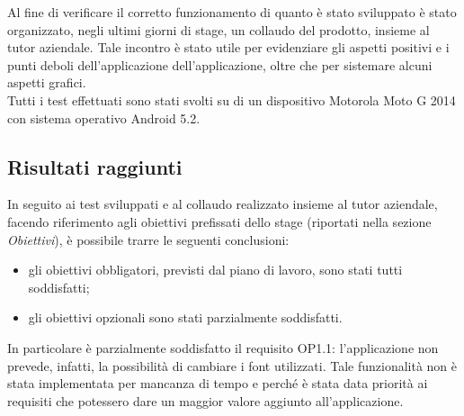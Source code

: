 \documentclass[../Tesi.tex]{subfiles}
\begin{document}
	Al fine di verificare il corretto funzionamento di quanto è stato sviluppato è stato organizzato, negli ultimi giorni di stage, un collaudo del prodotto, insieme al tutor aziendale. Tale incontro è stato utile per evidenziare gli aspetti positivi e i punti deboli dell'applicazione dell'applicazione, oltre che per sistemare alcuni aspetti grafici.\\
	Tutti i test effettuati sono stati svolti su di un dispositivo Motorola Moto G 2014 con sistema operativo Android 5.2.

	\subsection{Risultati raggiunti}
	In seguito ai test sviluppati e al collaudo realizzato insieme al tutor aziendale, facendo riferimento agli obiettivi prefissati dello stage (riportati nella sezione \textit{Obiettivi}), è possibile trarre le seguenti conclusioni:
	\begin{itemize}
		\item gli obiettivi obbligatori, previsti dal piano di lavoro, sono stati tutti soddisfatti;
		\item gli obiettivi opzionali sono stati parzialmente soddisfatti.
	\end{itemize}
	In particolare è parzialmente soddisfatto il requisito OP1.1: l'applicazione non prevede, infatti, la possibilità di cambiare i font utilizzati. Tale funzionalità non è stata implementata per mancanza di tempo e perché è stata data priorità ai requisiti che potessero dare un maggior valore aggiunto all'applicazione.
\end{document}
